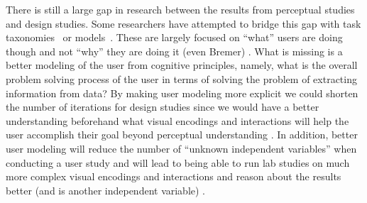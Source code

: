 There is still a large gap in research between the results from perceptual
studies and design studies. Some researchers have attempted to bridge this gap
with task taxonomies~\citep{Brehmer:2013,Shneiderman:1996} or 
models~\citep{Meyer:2012,Sacha:2014}. These are largely focused on 
``what'' users are doing though and not
``why'' they are doing it (even Bremer) 
. What is
missing is a better modeling of the user from cognitive principles, namely,
what is the overall problem solving process of the user in terms of solving the
problem of extracting information from data? By making user modeling more
explicit we could shorten the number of iterations for design studies since we
would have a better understanding beforehand what visual encodings and
interactions will help the user accomplish their goal beyond perceptual
understanding . In addition, better user modeling will reduce the number of
``unknown independent variables'' when conducting a user study and will lead to
being able to run lab studies on much more complex visual encodings and
interactions and reason about the results better (and is another independent
variable) .


